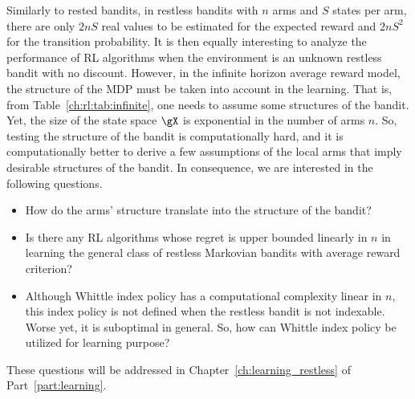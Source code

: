 Similarly to rested bandits, in restless bandits with $n$ arms and $S$ states per arm, there are only $2nS$ real values to be estimated for the expected reward and $2nS^2$ for the transition probability.
It is then equally interesting to analyze the performance of RL algorithms when the environment is an unknown restless bandit with no discount.
However, in the infinite horizon average reward model, the structure of the MDP must be taken into account in the learning.
That is, from Table~\ref{ch:rl:tab:infinite}, one needs to assume some structures of the bandit.
Yet, the size of the state space $\gX$ is exponential in the number of arms $n$.
So, testing the structure of the bandit is computationally hard, and it is computationally better to derive a few assumptions of the local arms that imply desirable structures of the bandit.
In consequence, we are interested in the following questions.
\begin{itemize}
    \item How do the arms' structure translate into the structure of the bandit?
    \item Is there any RL algorithms whose regret is upper bounded linearly in $n$ in learning the general class of restless Markovian bandits with average reward criterion?
    \item Although Whittle index policy has a computational complexity linear in $n$, this index policy is not defined when the restless bandit is not indexable. Worse yet, it is suboptimal in general. So, how can Whittle index policy be utilized for learning purpose?
\end{itemize}
These questions will be addressed in Chapter~\ref{ch:learning_restless} of Part~\ref{part:learning}.

\endgroup
